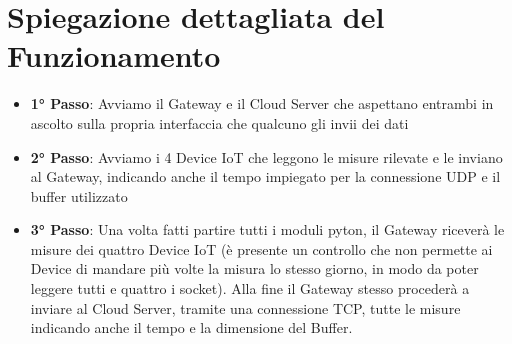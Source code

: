 \documentclass[a4paper,12pt]{report}
\begin{document}
	\begin{figure}[!htb]
	\end{figure}
	
	\chapter{Spiegazione dettagliata del Funzionamento}
	
	\begin{itemize}
		\item\textbf{ 1° Passo}: Avviamo il Gateway e il Cloud Server che aspettano entrambi in ascolto sulla propria interfaccia che qualcuno gli invii dei dati
		\item \textbf{2° Passo}: Avviamo i 4 Device IoT che leggono le misure rilevate e le inviano al Gateway, indicando anche il tempo impiegato per la connessione UDP e il buffer utilizzato
		\item \textbf{3° Passo}: Una volta fatti partire tutti i moduli pyton, il Gateway riceverà le misure dei quattro Device IoT (è presente un controllo che non permette ai Device di mandare più volte la misura lo stesso giorno, in modo da poter leggere tutti e quattro i socket). Alla fine il Gateway stesso procederà a inviare al Cloud Server, tramite una connessione TCP, tutte le misure indicando anche il tempo e la dimensione del Buffer.
	\end{itemize}
	
	
\end{document}
